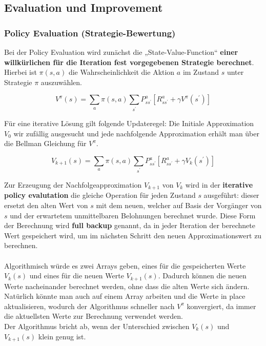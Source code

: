 \documentclass[10pt]{scrartcl}
\begin{document}
\subsection{Evaluation und Improvement}
\subsubsection{Policy Evaluation (Strategie-Bewertung)}
Bei der Policy Evaluation wird zunächst die „State-Value-Function“  \textbf{einer willkürlichen für die Iteration fest vorgegebenen Strategie berechnet}. Hierbei ist $\pi(s,a)$ die Wahrscheinlichkeit die Aktion $a$ im Zustand $s$ unter Strategie $\pi$ auszuwählen.

\begin{equation}
V^\pi (s) = \sum_{a} \pi(s,a) \sum_{s^{'}} P^a_{ss^{'}} [R^a_{ss^{'}} + \gamma V^\pi (s^{'})]
\end{equation}

Für eine iterative Lösung gilt folgende Updateregel: Die Initiale Approximation $V_{0}$ wir zufällig ausgesucht und jede nachfolgende Approximation erhält man über die Bellman Gleichung für $V^{\pi}$.

\begin{equation}
V_{k+1} (s) = \sum_{a} \pi(s,a) \sum_{s^{'}} P^a_{ss^{'}} [R^a_{ss^{'}} + \gamma V_{k} (s^{'})]
\end{equation}

Zur Erzeugung der Nachfolgeapproximation $V_{k+1}$ von $V_{k}$ wird in der \textbf{iterative policy evalutation} die gleiche Operation für jeden Zustand $s$ ausgeführt: dieser ersetzt den alten Wert von $s$ mit dem neuen, welcher auf Basis der Vorgänger von $s$ und der erwartetem unmittelbaren Belohnungen berechnet wurde. Diese Form der Berechnung wird \textbf{full backup} genannt, da in jeder Iteration der berechnete Wert gespeichert wird, um im nächsten Schritt den neuen Approximationswert zu berechnen.\\
\\
Algorithmisch würde es zwei Arrays geben, eines für die gespeicherten Werte $V_{k}(s)$ und eines für die neuen Werte $V_{k+1}(s)$. Dadurch können die neuen Werte nacheinander berechnet werden, ohne dass die alten Werte sich ändern. Natürlich könnte man auch auf einem Array arbeiten und die Werte \glqq in place\grqq\xspace aktualisieren, wodurch der Algorithmus schneller nach  $V^\pi$ konvergiert, da immer die aktuellsten Werte zur Berechnung verwendet werden.\\
Der Algorithmus bricht ab, wenn der Unterschied zwischen $V_{k}(s)$ und $V_{k+1}(s)$ klein genug ist.
\end{document}
